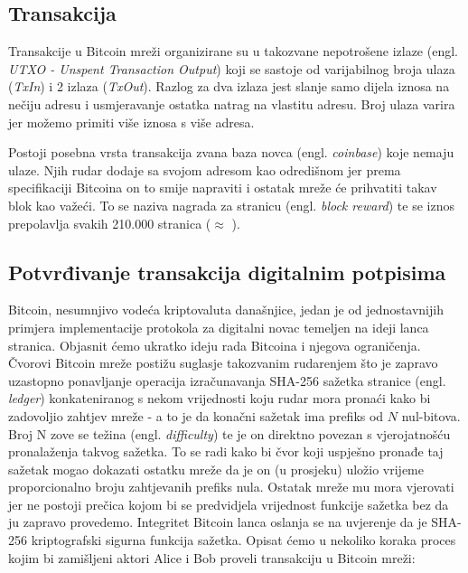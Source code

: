 \documentclass[utf8, zavrsni]{fer}
\begin{document}
\subsection{Transakcija}
Transakcije u Bitcoin mreži organizirane su u takozvane nepotrošene izlaze (engl. \textit{UTXO - Unspent Transaction Output}) koji se sastoje od varijabilnog broja ulaza (\textit{TxIn}) i 2 izlaza (\textit{TxOut}). Razlog za dva izlaza jest slanje samo dijela iznosa na nečiju adresu i usmjeravanje ostatka natrag na vlastitu adresu. Broj ulaza varira jer možemo primiti više iznosa s više adresa.

\label{block_reward}
Postoji posebna vrsta transakcija zvana baza novca (engl. \textit{coinbase}) koje nemaju ulaze. Njih rudar dodaje sa svojom adresom kao odredišnom jer prema specifikaciji Bitcoina on to smije napraviti i ostatak mreže će prihvatiti takav blok kao važeći. To se naziva nagrada za stranicu (engl. \textit{block reward}) te se iznos prepolavlja svakih 210.000 stranica ($\approx$ ).


\subsection{Potvrđivanje transakcija digitalnim potpisima}
Bitcoin, nesumnjivo vodeća kriptovaluta današnjice, jedan je od jednostavnijih primjera implementacije protokola za digitalni novac temeljen na ideji lanca stranica. Objasnit ćemo ukratko ideju rada Bitcoina i njegova ograničenja. Čvorovi Bitcoin mreže postižu suglasje takozvanim rudarenjem što je zapravo uzastopno ponavljanje operacija izračunavanja SHA-256 sažetka stranice (engl. \textit{ledger}) konkateniranog s nekom vrijednosti koju rudar mora pronaći kako bi zadovoljio zahtjev mreže - a to je da konačni sažetak ima prefiks od $N$ nul-bitova. Broj N zove se težina (engl. \textit{difficulty}) te je on direktno povezan s vjerojatnošću pronalaženja takvog sažetka. To se radi kako bi čvor koji uspješno pronađe taj sažetak mogao dokazati ostatku mreže da je on (u prosjeku) uložio vrijeme proporcionalno broju zahtjevanih prefiks nula. Ostatak mreže mu mora vjerovati jer ne postoji prečica kojom bi se predvidjela vrijednost funkcije sažetka bez da ju zapravo provedemo. Integritet Bitcoin lanca oslanja se na uvjerenje da je SHA-256 kriptografski sigurna funkcija sažetka. Opisat ćemo u nekoliko koraka proces kojim bi zamišljeni aktori Alice i Bob proveli transakciju u Bitcoin mreži:
\end{document}
